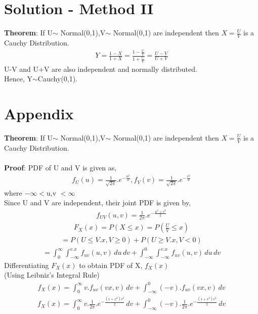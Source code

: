 \documentclass[journal,12pt,twocolumn]{IEEEtran}
\begin{document}
\section{Solution - Method II}
\textbf{Theorem}: If U$\sim$ Normal(0,1),V$\sim$ Normal(0,1) are independent then $X = \frac{U}{V}$ is a Cauchy Distribution.
\begin{align}
    Y = \frac{1-X}{1+X} = \frac{1-\frac{U}{V}}{1+\frac{U}{V}} = \frac{U-V}{U+V} 
\end{align}
U-V and U+V are also independent and normally distributed. \\
Hence, Y$\sim$Cauchy(0,1).
\section{Appendix}
\textbf{Theorem}: If U$\sim$ Normal(0,1),V$\sim$ Normal(0,1) are independent then $X = \frac{U}{V}$ is a Cauchy Distribution. \\ 
\\
\textbf{Proof}:
PDF of U and V is given as,
\begin{align}
    f_{U}(u) = \frac{1}{\sqrt{2\pi}}.e^{-\frac{u^{2}}{2}},f_{V}(v) = \frac{1}{\sqrt{2\pi}}.e^{-\frac{v^{2}}{2}}
\end{align}
where $-\infty<$u,v $<\infty$ \\
Since U and V are independent, their joint PDF is given by,
\begin{align}
    f_{UV}(u,v) = \frac{1}{2\pi}.e^{-\frac{u^{2}+v^{2}}{2}}
\end{align}
\begin{align}
    F_{X}(x) = P(X\leq x) = P\left(\frac{U}{V}\leq x\right)
\end{align}
\begin{align}
     = P(U\leq V.x,V\geq 0)+P(U\geq V.x,V< 0)
\end{align}
\begin{align}
     = \int_{0}^{\infty} \int_{-\infty}^{v.x} f_{uv}(u,v) \,du \,dv + \int_{-\infty}^{0} \int_{-\infty}^{v.x} f_{uv}(u,v) \,du \,dv
\end{align}
Differentiating $F_{X}(x)$ to obtain PDF of X, $f_{X}(x)$ \\
(Using Leibniz's Integral Rule)
\begin{align}
    f_{X}(x) = \int_{0}^{\infty} v. f_{uv}(vx,v) \,dv + \int_{-\infty}^{0}(-v).f_{uv}(vx,v) \,dv
\end{align}
\begin{align}
    f_{X}(x) = \int_{0}^{\infty} v. \frac{1}{2\pi}.e^{-\frac{(1+x^{2})v^{2}}{2}} \,dv + \int_{-\infty}^{0}(-v).\frac{1}{2\pi}.e^{-\frac{(1+x^{2})v^{2}}{2}}\,dv
\end{align}
\end{document}
